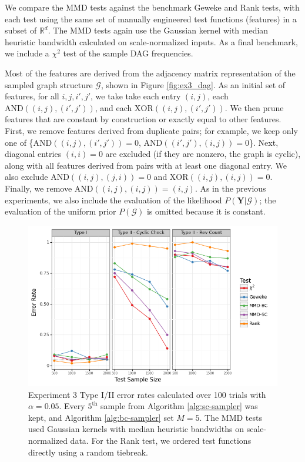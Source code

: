 \documentclass[a4paper,11pt]{article}
\begin{document}
We compare the MMD tests against the benchmark Geweke and Rank tests, with each test using the same set of manually engineered test functions (features) in a subset of $\mathbb{R}^{d}$. The MMD tests again use the Gaussian kernel with median heuristic bandwidth calculated on scale-normalized inputs. As a final benchmark, we include a $\chi^{2}$ test of the sample DAG frequencies. 

Most of the features are derived from the adjacency matrix representation of the sampled graph structure $\mathcal{G}$, shown in Figure \ref{fig:ex3_dag}. As an initial set of features, for all $i,j,i',j'$, we take
take each entry $(i,j)$, each $\mathrm{AND}((i,j),(i',j'))$, and each $\mathrm{XOR}((i,j),(i',j'))$. We then prune features that are constant by construction or exactly equal to other features. First, we remove features derived from duplicate pairs; for example, we keep only one of \{$\mathrm{AND}((i,j),(i',j'))=0$, $\mathrm{AND}((i',j'),(i,j))=0$\}. Next, diagonal entries $(i,i)=0$ are excluded (if they are nonzero, the graph is cyclic), along with all features derived from pairs with at least one diagonal entry. We also exclude $\mathrm{AND}((i,j),(j,i))=0$ and $\mathrm{XOR}((i,j),(i,j))=0$. Finally, we remove $\mathrm{AND}((i,j),(i,j)) = (i,j)$. As in the previous experiments, we also include the evaluation of the likelihood $P(\mathbf{Y}|\mathcal{G})$; the evaluation of the uniform prior $P(\mathcal{G})$ is omitted because it is constant.

\begin{figure}
    \centering
    \includegraphics[width=\textwidth]{figures/graph_comparison.png}
    \caption{Experiment 3 Type I/II error rates calculated over 100 trials with $\alpha=0.05$. Every $5^{\text{th}}$ sample from Algorithm \ref{alg:sc-sampler} was kept, and Algorithm \ref{alg:bc-sampler} set $M=5$. The MMD tests used Gaussian kernels with median heuristic bandwidths on scale-normalized data. For the Rank test, we ordered test functions directly using a random tiebreak.}
    \label{fig:ex3_comparison}
\end{figure}
\end{document}
